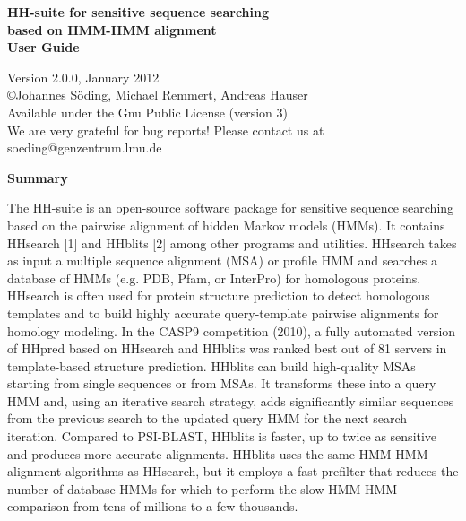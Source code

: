 \documentclass[11pt,a4paper]{article}
\begin{document}


\begin{center}

\vspace{20mm}
 
{\huge \bf HH-suite for sensitive sequence searching\\[2mm] based on HMM-HMM alignment}\\[4mm] 

{\Large \bf User Guide}

  Version 2.0.0, January 2012\\[2mm]
{\copyright  Johannes S\"oding, Michael Remmert, Andreas Hauser}\\[2mm]
Available under the Gnu Public License (version 3)\\[2mm]
We are very grateful for bug reports! Please contact us at soeding@genzentrum.lmu.de

{\bf \Large Summary}

\end{center}

\noindent The HH-suite is an open-source software package for sensitive sequence searching based on the pairwise alignment of hidden Markov models (HMMs). It contains HHsearch [1] and HHblits [2] among other programs and utilities. HHsearch takes as input a multiple sequence alignment (MSA) or profile HMM and searches a database of HMMs (e.g. PDB, Pfam, or InterPro) for homologous proteins. HHsearch is often used for protein structure prediction to detect homologous templates and to build highly accurate query-template pairwise alignments for homology modeling. In the CASP9 competition (2010), a fully automated version of HHpred based on HHsearch and HHblits was ranked best out of 81 servers in template-based structure prediction. HHblits can build high-quality MSAs starting from single sequences or from MSAs. It transforms these into a query HMM and, using an iterative search strategy, adds significantly similar sequences from the previous search to the updated query HMM for the next search iteration. Compared to PSI-BLAST, HHblits is faster, up to twice as sensitive and produces more accurate alignments. HHblits uses the same HMM-HMM alignment algorithms as HHsearch, but it employs a fast prefilter that reduces the number of database HMMs for which to perform the slow HMM-HMM comparison from tens of millions to a few thousands. \\[2mm]
\end{document}
